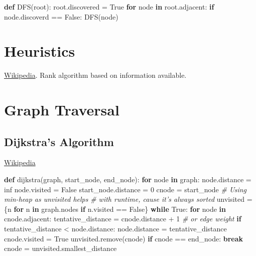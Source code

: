\documentclass[11pt]{article}
\newenvironment{Shaded}{}{}
\newcommand{\KeywordTok}[1]{\textcolor[rgb]{0.00,0.44,0.13}{\textbf{{#1}}}}
\newcommand{\DecValTok}[1]{\textcolor[rgb]{0.25,0.63,0.44}{{#1}}}
\newcommand{\CommentTok}[1]{\textcolor[rgb]{0.38,0.63,0.69}{\textit{{#1}}}}
\newcommand{\NormalTok}[1]{{#1}}
\newcommand{\VariableTok}[1]{\textcolor[rgb]{0.10,0.09,0.49}{{#1}}}
\newcommand{\ControlFlowTok}[1]{\textcolor[rgb]{0.00,0.44,0.13}{\textbf{{#1}}}}
\newcommand{\OperatorTok}[1]{\textcolor[rgb]{0.40,0.40,0.40}{{#1}}}
\begin{document}
\begin{Shaded}
\begin{Highlighting}[]
\KeywordTok{def} \NormalTok{DFS(root):}
  \NormalTok{root.discovered }\OperatorTok{=} \VariableTok{True}
  \ControlFlowTok{for} \NormalTok{node }\KeywordTok{in} \NormalTok{root.adjacent:}
    \ControlFlowTok{if} \NormalTok{node.discoverd }\OperatorTok{==} \VariableTok{False}\NormalTok{:}
      \NormalTok{DFS(node)}
\end{Highlighting}
\end{Shaded}

    \section{Heuristics}\label{heuristics}

\href{https://en.wikipedia.org/wiki/Heuristic_(computer_science)}{Wikipedia}.
Rank algorithm based on information available.

    \section{Graph Traversal}\label{graph-traversal}

    \subsection{Dijkstra's Algorithm}\label{dijkstras-algorithm}

\href{https://en.wikipedia.org/wiki/Dijkstra\%27s_algorithm}{Wikipedia}

\begin{Shaded}
\begin{Highlighting}[]
\KeywordTok{def} \NormalTok{dijkstra(graph, start_node, end_node):}
  \ControlFlowTok{for} \NormalTok{node }\KeywordTok{in} \NormalTok{graph:}
    \NormalTok{node.distance }\OperatorTok{=} \NormalTok{inf}
    \NormalTok{node.visited }\OperatorTok{=} \VariableTok{False}
  \NormalTok{start_node.distance }\OperatorTok{=} \DecValTok{0}
  \NormalTok{cnode }\OperatorTok{=} \NormalTok{start_node}
  \CommentTok{# Using min-heap as unvisited helps}
  \CommentTok{# with runtime, cause it's always sorted}
  \NormalTok{unvisited }\OperatorTok{=} \NormalTok{\{n }\ControlFlowTok{for} \NormalTok{n }\KeywordTok{in} \NormalTok{graph.nodes }\ControlFlowTok{if} \NormalTok{n.visited }\OperatorTok{==} \VariableTok{False}\NormalTok{\}}
  \ControlFlowTok{while} \VariableTok{True}\NormalTok{:}
    \ControlFlowTok{for} \NormalTok{node }\KeywordTok{in} \NormalTok{cnode.adjacent:}
      \NormalTok{tentative_distance }\OperatorTok{=} \NormalTok{cnode.distance }\OperatorTok{+} \DecValTok{1} \CommentTok{# or edge weight}
      \ControlFlowTok{if} \NormalTok{tentative_distance }\OperatorTok{<} \NormalTok{node.distance:}
        \NormalTok{node.distance }\OperatorTok{=} \NormalTok{tentative_distance}
      \NormalTok{cnode.visited }\OperatorTok{=} \VariableTok{True}
      \NormalTok{unvisited.remove(cnode)}
      \ControlFlowTok{if} \NormalTok{cnode }\OperatorTok{==} \NormalTok{end_node:}
        \ControlFlowTok{break}
      \NormalTok{cnode }\OperatorTok{=} \NormalTok{unvisited.smallest_distance}
\end{Highlighting}
\end{Shaded}
\end{document}

